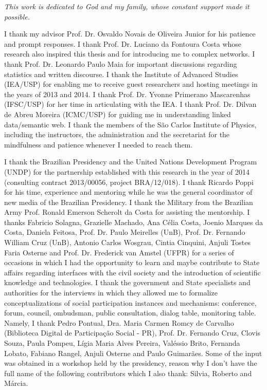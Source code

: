 \documentclass[
12pt,		%
openright,	%
twoside,  %
a4paper,			%
chapter=TITLE,		%
english,			%
french,				%
spanish,			%
brazil				%
]{USPSC}
\begin{document}
\begin{dedicatoria}
   \vspace*{\fill}
   \centering
   \noindent
   \textit{ This work is dedicated to God and my family, whose constant support made it possible.} \vspace*{\fill}
\end{dedicatoria}

\begin{agradecimentos}
I thank my advisor
Prof. Dr. Osvaldo Novais de Oliveira Junior
for his patience and prompt responses.	
I thank Prof. Dr. Luciano da Fontoura Costa
whose research also inspired this thesis
and for introducing me to complex networks.
I thank Prof. Dr. Leonardo Paulo Maia for important discussions regarding statistics and
written discourse.
I thank the Institute of Advanced Studies (IEA/USP)
for enabling me to receive guest researchers and hosting meetings in the years of 2013 and 2014.
I thank Prof. Dr. Yvonne Primerano Mascarenhas (IFSC/USP) for her time in articulating with the IEA.
I thank Prof. Dr. Dilvan de Abreu Moreira (ICMC/USP) for guiding me in understanding linked data/semantic web.
I thank the members of the São Carlos Institute of Physics,
including the instructors, the administration and the secretariat
for the mindfulness and patience whenever I needed to reach them.

	I thank the Brazilian Presidency and the United Nations Development Program (UNDP) for
the partnership established with this research in the year of 2014 (consulting contract 2013/00056, project BRA/12/018).
I thank Ricardo Poppi for his time, experience and mentoring while he was the general coordinator of new media of the Brazilian Presidency.
	I thank the Military from the Brazilian Army Prof. Ronald Emerson Scherolt da Costa for assisting the mentorship.
	I thanks Fabricio Solagna, Grazielle Machado, Ana Célia Costa,
	Joenio Marques da Costa, Daniela Feitosa, Prof. Dr. Paulo Meirelles (UnB), Prof. Dr. Fernando William Cruz (UnB), Antonio Carlos Wosgrau,
	Cintia Cinquini, Anjuli Tostes Faria Osterne and Prof. Dr. Frederick van Amstel (UFPR) for
a series of occasions in which I had the opportunity to learn and maybe contribute to State affairs
regarding interfaces with the civil society and the introduction of scientific knowledge and technologies.
I thank the government and State specialists and authorities for the interviews in which they
allowed me to formalize conceptualizations of social participation instances and mechanisms:
conference, forum, council, ombudsman, public consultation, dialog table, monitoring table.
	Namely, I thank Pedro Pontual, Dra. Maria Carmen Romcy de Carvalho (Biblioteca Digital de Participação Social - PR), Prof. Dr. Fernando Cruz, Clovis Souza, Paula Pompeu, Lígia Maria Alves Pereira,
Valéssio Brito, Fernanda Lobato, Fabiano Rangel, Anjuli Osterne and Paulo Guimarães.
Some of the input was obtained in a workshop held by the presidency,
reason why I don't have the full name of the following contributors
which I also thank: Silvia, Roberto and Márcia.


\end{agradecimentos}
\end{document}

